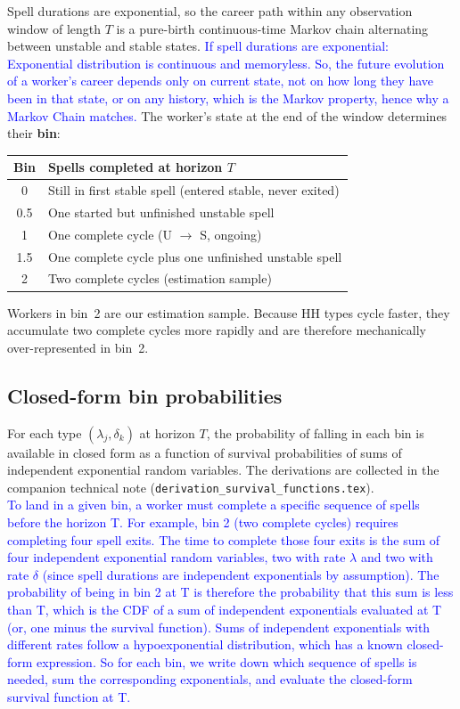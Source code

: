 \documentclass[12pt,a4paper]{article}
\begin{document}
\noindent
Spell durations are exponential, so the career path within any observation window of
length $T$ is a pure-birth continuous-time Markov chain alternating between unstable
and stable states. 
\textcolor{blue}{If spell durations are exponential: Exponential distribution is continuous and memoryless. So, the future evolution of a worker's career depends only on current state, not on how long they have been in that state, or on any history, which is the Markov property, hence why a Markov Chain matches.}
The worker's state at the end of the window determines their
\textbf{bin}:

\begin{center}
\begin{tabular}{cl}
\toprule
Bin & Spells completed at horizon $T$\\
\midrule
0 & Still in first stable spell (entered stable, never exited)\\
0.5 & One started but unfinished unstable spell\\
1 & One complete cycle (U $\to$ S, ongoing)\\
1.5 & One complete cycle plus one unfinished unstable spell\\
2 & Two complete cycles (estimation sample)\\
\bottomrule
\end{tabular}
\end{center}

\noindent
Workers in bin~2 are our estimation sample. Because HH types cycle faster, they
accumulate two complete cycles more rapidly and are therefore mechanically
over-represented in bin~2.

\subsection*{Closed-form bin probabilities}

For each type $(\lambda_j, \delta_k)$ at horizon $T$, the probability of falling in
each bin is available in closed form as a function of survival probabilities of sums of
independent exponential random variables. The derivations are collected in the companion
technical note (\texttt{derivation\_survival\_functions.tex}). \\ \textcolor{blue}{To land in a given bin, a worker must complete a specific sequence of spells before the horizon T. For example, bin 2 (two complete cycles) requires completing four spell exits. The time to complete those four exits is the sum of four independent exponential random variables, two with rate $\lambda$ and two with rate $\delta$ (since spell durations are independent exponentials by assumption).
The probability of being in bin 2 at T is therefore the probability that this sum is less than T, which is the CDF of a sum of independent exponentials evaluated at T (or, one minus the survival function). Sums of independent exponentials with different rates follow a hypoexponential distribution, which has a known closed-form expression. So for each bin, we write down which sequence of spells is needed, sum the corresponding exponentials, and evaluate the closed-form survival function at T.}
\end{document}
